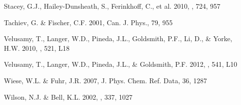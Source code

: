 \documentclass[12pt]{aastex}
\begin{document}
\begin{thebibliography}{}
Stacey, G.J., Hailey-Dunsheath, S., Ferinkhoff, C., et al. 2010, \apj, 724, 957

Tachiev, G. \& Fischer, C.F. 2001, Can. J. Phys., 79, 955

Velusamy, T., Langer, W.D., Pineda, J.L., Goldsmith, P.F., Li, D., \& Yorke, H.W. 2010, \aap, 521, L18

Velusamy, T., Langer, W.D., Pineda, J.L., \& Goldsmith, P.F. 2012, \aap, 541, L10

Wiese, W.L. \& Fuhr, J.R. 2007, J. Phys. Chem. Ref. Data, 36, 1287

Wilson, N.J. \& Bell, K.L. 2002, \mnras, 337, 1027

\end{thebibliography}
\end{document}
